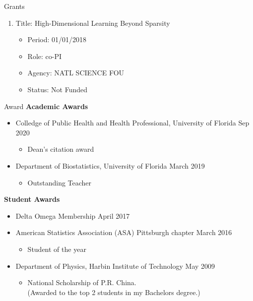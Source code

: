\documentclass{resume} %
\begin{document}
\begin{rSection}{Grants}
\begin{enumerate}[noitemsep,topsep=0pt]
\item Title: High-Dimensional Learning Beyond Sparsity
\begin{itemize}[noitemsep,topsep=0pt,leftmargin=*]
\item[] Period: 01/01/2018
\item[] Role: co-PI
\item[] Agency: NATL SCIENCE FOU
\item[] Status:  Not Funded
\end{itemize}


\end{enumerate}

\end{rSection}


\begin{rSection}{Award}
\textbf{Academic Awards}
\begin{itemize}[noitemsep,topsep=0pt]

\item  Colledge of Public Health and Health Professional, University of Florida \hfill Sep 2020
\begin{itemize}[noitemsep,topsep=0pt]
\item Dean's citation award
\end{itemize}

\item  Department of Biostatistics, University of Florida \hfill March 2019
\begin{itemize}[noitemsep,topsep=0pt]
\item Outstanding Teacher
\end{itemize}
\end{itemize}


\textbf{Student Awards}
\begin{itemize}[noitemsep,topsep=0pt]
\item  Delta Omega Membership \hfill April 2017
\item American Statistics Association (ASA) Pittsburgh chapter  \hfill March 2016
\begin{itemize}[noitemsep,topsep=0pt]
\item Student of the year
\end{itemize}
\item Department of Physics, Harbin Institute of Technology \hfill May 2009
\begin{itemize}[noitemsep,topsep=0pt]
\item National Scholarship of P.R. China. \\(Awarded to the top 2 students in my Bachelors degree.)
\end{itemize}
\end{itemize}



\end{rSection}
\end{document}
